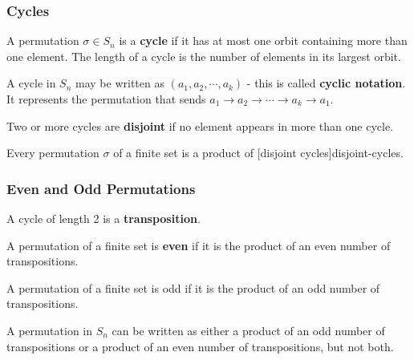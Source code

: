 \documentclass{article}
\begin{document}
\subsubsection{Cycles}

\begin{definition}[cycle]
A \@{permutation} $\sigma \in S_n$ is a \textbf{cycle} if it has at most one \@{orbit} containing more than one element. The length of a cycle is the number of elements in its largest orbit.
\end{definition}

\begin{definition}
A \@{cycle} in $S_n$ may be written as $(a_1, a_2, \cdots, a_k)$ - this is called \textbf{cyclic notation}. It represents the \@{permutation} that sends $a_1 \to a_2 \to \cdots \to a_k \to a_1$.
\end{definition}

\begin{definition}
Two or more \@{cycles} are \textbf{disjoint} if no element appears in more than one cycle.
\end{definition}

\begin{theorem}\label{permutation-as-product-of-disjoint-cycles}
Every \@{permutation} $\sigma$ of a finite set is a product of \@[disjoint cycles]{disjoint-cycles}.
\end{theorem}

\subsubsection{Even and Odd Permutations}

\begin{definition}[transposition]
A \@{cycle} of length 2 is a \textbf{transposition}.
\end{definition}

\begin{definition}
A \@{permutation} of a finite set is \textbf{even} if it is the product of an even number of \@{transpositions}.
\end{definition}

\begin{definition}
A \@{permutation} of a finite set is odd if it is the product of an odd number of \@{transpositions}.
\end{definition}

\begin{theorem}\label{permutation-parity-is-well-defined}
A \@{permutation} in $S_n$ can be written as either a product of an odd number of \@{transpositions} or a product of an even number of transpositions, but not both.
\end{theorem}
\end{document}
